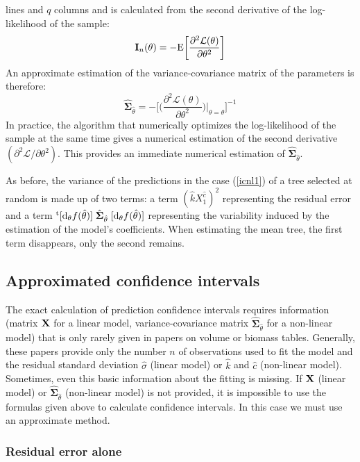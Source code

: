 lines and $q$ columns and is calculated from the second derivative of the log-likelihood of the sample:
\[
\mathbf{I}_n(\theta)=-\mathrm{E}\bigg[\frac{\partial^2\mathcal{L}(\theta)}
{\partial\theta^2}\bigg]
\]
An approximate estimation of the variance-covariance matrix of the parameters is therefore:
\[
\hat{\boldsymbol{\Sigma}}_{\hat{\theta}}=-\bigg[\bigg(\frac{\partial^2\mathcal{L}(\theta)}
{\partial\theta^2}\bigg)\bigg|_{\theta=\hat{\theta}}\bigg]^{-1}
\]
In practice, the algorithm that numerically optimizes the log-likelihood of the sample at the same time gives a numerical estimation of the second derivative 
$(\partial^2\mathcal{L}/\partial\theta^2)$. This provides an immediate numerical estimation of 
$\hat{\boldsymbol{\Sigma}}_{\hat{\theta}}$.

As before, the variance of the predictions in the case 
(\ref{icnl1}) of a tree selected at random is made up of two terms: a term $(\hat{k}X_1^{\hat{c}})^2$ representing the residual error and a term 
${}^{\mathrm{t}}[\mathrm{d}_{\theta}f(\hat{\theta})]\;\hat{\boldsymbol{\Sigma}}_{\hat{\theta}}\;
[\mathrm{d}_{\theta}f(\hat{\theta})]$ representing the variability induced by the estimation of the model's coefficients. When estimating the mean tree, the first term disappears, only the second remains.

\subsection{Approximated confidence intervals\label{papp}}

The exact calculation of prediction confidence intervals requires information (matrix $\mathbf{X}$ for a linear model, variance-covariance matrix $\hat{\boldsymbol{\Sigma}}_{\hat{\theta}}$ for a non-linear model) that is only rarely given in papers on volume or biomass tables. Generally, these papers provide only the number $n$ of observations used to fit the model and the residual standard deviation $\hat{\sigma}$ (linear model) or $\hat{k}$ and $\hat{c}$ (non-linear model). Sometimes, even this basic information about the fitting is missing. If $\mathbf{X}$ (linear model) or 
$\hat{\boldsymbol{\Sigma}}_{\hat{\theta}}$ (non-linear model) is not provided, it is impossible to use the formulas given above to calculate confidence intervals. In this case we must use an approximate method.

\subsubsection{Residual error alone}

